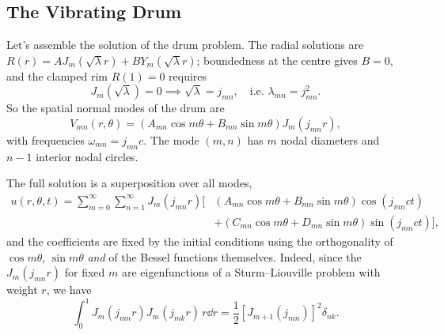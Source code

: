 \documentclass[a4paper]{scrartcl}
\begin{document}
\subsection{The Vibrating Drum}

Let's assemble the solution of the drum problem. The radial solutions are $R(r) = A J_m(\sqrt{\lambda} r) + B Y_m(\sqrt{\lambda}r)$; boundedness at the centre gives $B = 0$, and the clamped rim $R(1) = 0$ requires
$$
J_m(\sqrt{\lambda}) = 0 \implies \sqrt{\lambda} = j_{mn}, \quad \text{i.e. } \lambda_{mn} = j_{mn}^2.
$$
So the spatial normal modes of the drum are
$$
V_{mn}(r, \theta) = \left(A_{mn} \cos m \theta + B_{mn} \sin m \theta\right) J_m (j_{mn} r),
$$
with frequencies $\omega_{mn} = j_{mn} c$. The mode $(m, n)$ has $m$ nodal diameters and $n - 1$ interior nodal circles.

\begin{center}
\end{center}

The full solution is a superposition over all modes,
\begin{align*}
u(r, \theta, t) = \sum_{m = 0}^{\infty} \sum_{n = 1}^{\infty} J_m(j_{mn} r) \Big[&\left(A_{mn} \cos m\theta + B_{mn} \sin m \theta\right) \cos (j_{mn} c t) \\
&+ \left(C_{mn} \cos m \theta + D_{mn} \sin m \theta\right) \sin (j_{mn} c t)\Big],
\end{align*}
and the coefficients are fixed by the initial conditions using the orthogonality of $\cos m\theta$, $\sin m \theta$ \emph{and} of the Bessel functions themselves. Indeed, since the $J_m(j_{mn} r)$ for fixed $m$ are eigenfunctions of a Sturm--Liouville problem with weight $r$, we have
$$
\int_0^1 J_m(j_{mn} r) J_m (j_{mk}r)\, r \dd r = \frac{1}{2}\left[J_{m + 1}(j_{mn})\right]^2 \delta_{nk}.
$$
\end{document}
